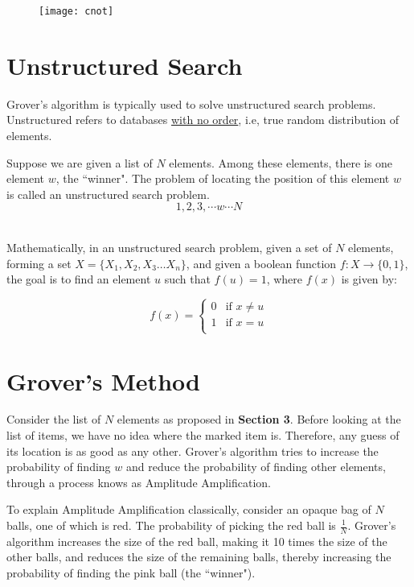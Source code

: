 \documentclass[a4paper]{article}
\begin{document}
\begin{figure}[h]
\texttt{[image: cnot]}
\centering
\end{figure}

\pagebreak


\section{ Unstructured Search }

Grover's algorithm is typically used to solve unstructured search problems.
Unstructured refers to databases \underline{with no order}, i.e, true random
distribution of elements. 
\\
\par

Suppose we are given a list of $N$ elements. Among these elements, there is one
element $w$, the ``winner". The problem of locating the position of this element
$w$ is called an unstructured search problem.  $$ 1, 2, 3, \cdots w \cdots N $$
\\ \par

Mathematically, in an unstructured search problem, given a set of $N$ elements,
forming a set $X = \{X_1, X_2, X_3 \ldots X_n\} $, and given a boolean function
$f: X \to \{0, 1\}$, the goal is to find an element $u$ such that $f(u) = 1$,
where $f(x)$ is given by:

\[
    f(x) = \left\{
        \begin{array}{ll}
            0 & \mbox{if } x \neq u \\
            1 & \mbox{if } x = u \\
        \end{array}
        \right.
\]

\pagebreak


\section{ Grover's Method }
Consider the list of $N$ elements as proposed in \textbf{Section 3}. Before
looking at the list of items, we have no idea where the marked item is.
Therefore, any guess of its location is as good as any other. Grover's algorithm
tries to increase the probability of finding $w$ and reduce the probability of 
finding other elements, through a process knows as Amplitude Amplification.
\\
\par

To explain Amplitude Amplification classically, consider an opaque bag of $N$
balls, one of which is red. The probability of picking the red ball is
$\frac{1}{N}$.  Grover's algorithm increases the size of the red ball, making
it 10 times the size of the other balls, and reduces the size of the remaining
balls, thereby increasing the probability of finding the pink ball (the ``winner").
\end{document}
